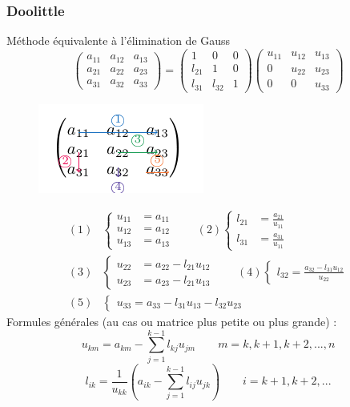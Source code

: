 \documentclass[resume]{subfiles}
\begin{document}
\subsubsection{Doolittle}
Méthode équivalente à l'élimination de Gauss
$$\begin{pmatrix}
a_{11} & a_{12} & a_{13}\\
a_{21} & a_{22} & a_{23}\\
a_{31} & a_{32} & a_{33}
\end{pmatrix}=\begin{pmatrix}
1 & 0 & 0\\
l_{21} & 1 & 0\\
l_{31} & l_{32} & 1
\end{pmatrix}\begin{pmatrix}
u_{11} & u_{12} & u_{13}\\
0 & u_{22} & u_{23}\\
0 & 0 & u_{33}
\end{pmatrix}$$
\begin{figure}[H]
\centering
\includegraphics[scale=1,page=1]{drwg_6.pdf}
\end{figure}
\begin{align*}
(1)&\begin{cases}
u_{11}&=a_{11}\\
u_{12}&=a_{12}\\
u_{13}&=a_{13}
\end{cases} \qquad (2)\begin{cases}
l_{21}&=\frac{a_{21}}{u_{11}}\\
l_{31}&=\frac{a_{31}}{u_{11}}
\end{cases}\\
(3)&\begin{cases}
u_{22}&=a_{22}-l_{21}u_{12}\\
u_{23}&=a_{23}-l_{21}u_{13}
\end{cases} \qquad(4)\begin{cases}
l_{32}=\frac{a_{32}-l_{31}u_{12}}{u_{22}}
\end{cases}\\
(5)&\begin{cases}u_{33}=a_{33}-l_{31}u_{13}-l_{32}u_{23}\end{cases}
\end{align*}
Formules générales (au cas ou matrice plus petite ou plus grande) :
$$u_{km}=a_{km}-\sum_{j=1}^{k-1}l_{kj}u_{jm}\qquad m=k,k+1,k+2,...,n$$
$$l_{ik}=\frac{1}{u_{kk}}\left(a_{ik}-\sum_{j=1}^{k-1}l_{ij}u_{jk}\right)\qquad i=k+1,k+2,...$$
\end{document}
